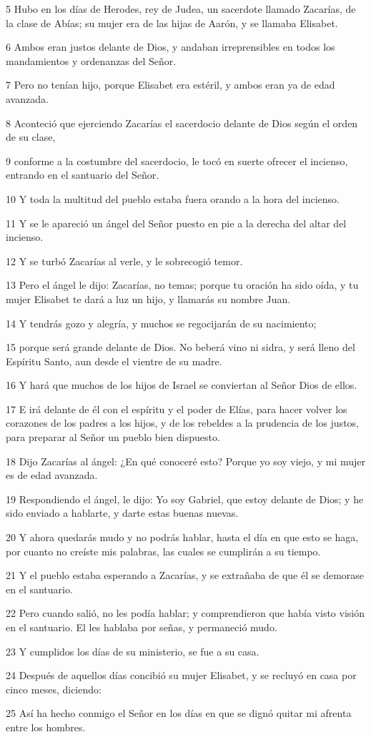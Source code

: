\par 5 Hubo en los días de Herodes, rey de Judea, un sacerdote llamado Zacarías, de la clase de Abías; su mujer era de las hijas de Aarón, y se llamaba Elisabet.
\par 6 Ambos eran justos delante de Dios, y andaban irreprensibles en todos los mandamientos y ordenanzas del Señor.
\par 7 Pero no tenían hijo, porque Elisabet era estéril, y ambos eran ya de edad avanzada.
\par 8 Aconteció que ejerciendo Zacarías el sacerdocio delante de Dios según el orden de su clase,
\par 9 conforme a la costumbre del sacerdocio, le tocó en suerte ofrecer el incienso, entrando en el santuario del Señor.
\par 10 Y toda la multitud del pueblo estaba fuera orando a la hora del incienso.
\par 11 Y se le apareció un ángel del Señor puesto en pie a la derecha del altar del incienso.
\par 12 Y se turbó Zacarías al verle, y le sobrecogió temor.
\par 13 Pero el ángel le dijo: Zacarías, no temas; porque tu oración ha sido oída, y tu mujer Elisabet te dará a luz un hijo, y llamarás su nombre Juan.
\par 14 Y tendrás gozo y alegría, y muchos se regocijarán de su nacimiento;
\par 15 porque será grande delante de Dios. No beberá vino ni sidra, y será lleno del Espíritu Santo, aun desde el vientre de su madre.
\par 16 Y hará que muchos de los hijos de Israel se conviertan al Señor Dios de ellos.
\par 17 E irá delante de él con el espíritu y el poder de Elías, para hacer volver los corazones de los padres a los hijos, y de los rebeldes a la prudencia de los justos, para preparar al Señor un pueblo bien dispuesto.
\par 18 Dijo Zacarías al ángel: ¿En qué conoceré esto? Porque yo soy viejo, y mi mujer es de edad avanzada.
\par 19 Respondiendo el ángel, le dijo: Yo soy Gabriel, que estoy delante de Dios; y he sido enviado a hablarte, y darte estas buenas nuevas.
\par 20 Y ahora quedarás mudo y no podrás hablar, hasta el día en que esto se haga, por cuanto no creíste mis palabras, las cuales se cumplirán a su tiempo.
\par 21 Y el pueblo estaba esperando a Zacarías, y se extrañaba de que él se demorase en el santuario.
\par 22 Pero cuando salió, no les podía hablar; y comprendieron que había visto visión en el santuario. El les hablaba por señas, y permaneció mudo.
\par 23 Y cumplidos los días de su ministerio, se fue a su casa.
\par 24 Después de aquellos días concibió su mujer Elisabet, y se recluyó en casa por cinco meses, diciendo:
\par 25 Así ha hecho conmigo el Señor en los días en que se dignó quitar mi afrenta entre los hombres.

